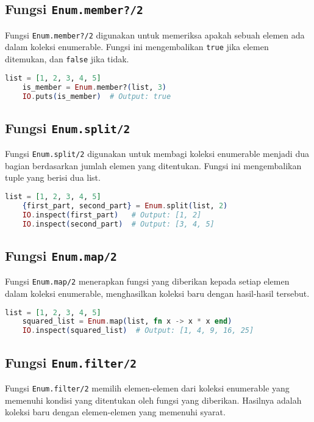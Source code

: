 \subsection{Fungsi \texttt{Enum.member?/2}}

Fungsi \texttt{Enum.member?/2} digunakan untuk memeriksa apakah sebuah elemen ada dalam koleksi enumerable. Fungsi ini mengembalikan \texttt{true} jika elemen ditemukan, dan \texttt{false} jika tidak.

\begin{lstlisting}[language=Elixir]
	list = [1, 2, 3, 4, 5]
	is_member = Enum.member?(list, 3)
	IO.puts(is_member)  # Output: true
\end{lstlisting}

\subsection{Fungsi \texttt{Enum.split/2}}

Fungsi \texttt{Enum.split/2} digunakan untuk membagi koleksi enumerable menjadi dua bagian berdasarkan jumlah elemen yang ditentukan. Fungsi ini mengembalikan tuple yang berisi dua list.

\begin{lstlisting}[language=Elixir]
	list = [1, 2, 3, 4, 5]
	{first_part, second_part} = Enum.split(list, 2)
	IO.inspect(first_part)   # Output: [1, 2]
	IO.inspect(second_part)  # Output: [3, 4, 5]
\end{lstlisting}

\subsection{Fungsi \texttt{Enum.map/2}}

Fungsi \texttt{Enum.map/2} menerapkan fungsi yang diberikan kepada setiap elemen dalam koleksi enumerable, menghasilkan koleksi baru dengan hasil-hasil tersebut.

\begin{lstlisting}[language=Elixir]
	list = [1, 2, 3, 4, 5]
	squared_list = Enum.map(list, fn x -> x * x end)
	IO.inspect(squared_list)  # Output: [1, 4, 9, 16, 25]
\end{lstlisting}

\subsection{Fungsi \texttt{Enum.filter/2}}

Fungsi \texttt{Enum.filter/2} memilih elemen-elemen dari koleksi enumerable yang memenuhi kondisi yang ditentukan oleh fungsi yang diberikan. Hasilnya adalah koleksi baru dengan elemen-elemen yang memenuhi syarat.

